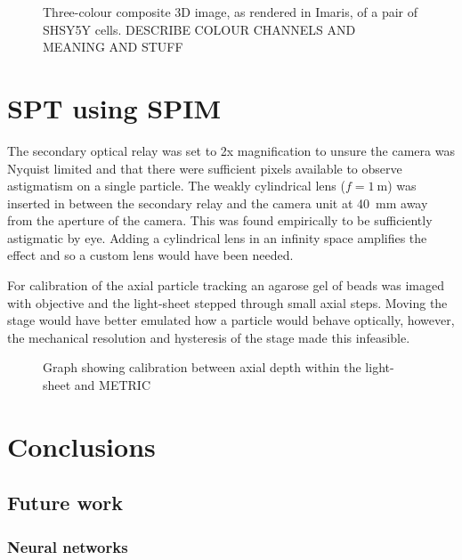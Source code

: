 \begin{figure}
  \centering
  \caption{Three-colour composite 3D image, as rendered in Imaris, of a pair of SHSY5Y cells.
          DESCRIBE COLOUR CHANNELS AND MEANING AND STUFF}
  \label{}
\end{figure}


\section{SPT using SPIM}

The secondary optical relay was set to 2x magnification to unsure the camera was Nyquist limited and that there were sufficient pixels available to observe astigmatism on a single particle.
The weakly cylindrical lens ($f = \SI{1}{\metre}$) was inserted in between the secondary relay and the camera unit at \SI{40}{\milli\metre} away from the aperture of the camera.
This was found empirically to be sufficiently astigmatic by eye.
Adding a cylindrical lens in an infinity space amplifies the effect and so a custom lens would have been needed.

For calibration of the axial particle tracking an agarose gel of beads was imaged with objective and the light-sheet stepped through small axial steps.
Moving the stage would have better emulated how a particle would behave optically, however, the mechanical resolution and hysteresis of the stage made this infeasible.

\begin{figure}
  \centering
  \caption{Graph showing calibration between axial depth within the light-sheet and METRIC}
  \label{}
\end{figure}

\section{Conclusions}


\subsection{Future work}

\subsubsection{Neural networks} %

